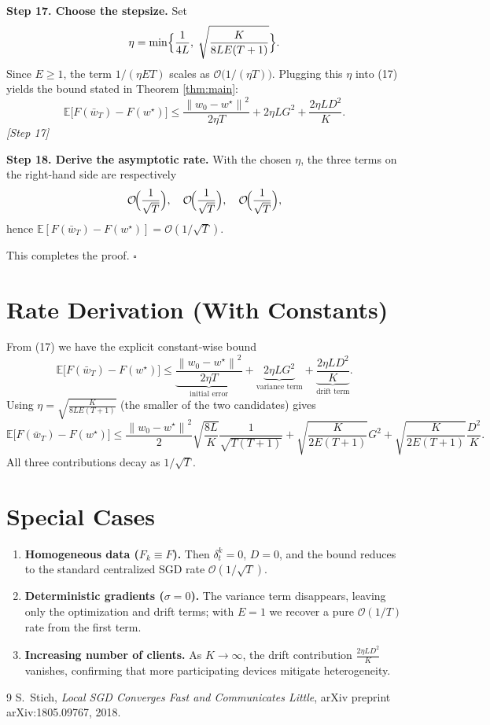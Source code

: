 \documentclass{article}
\newcommand{\EE}{\mathbb{E}}
\newcommand{\norm}[1]{\left\lVert#1\right\rVert}
\begin{document}
\bigskip
\noindent\textbf{Step 17. Choose the stepsize.}  
Set
\[
\eta = \min\Bigl\{\frac{1}{4L},\; \sqrt{\frac{K}{8LE(T+1)}}\Bigr\}.
\]
Since $E\ge1$, the term $1/(\eta E T)$ scales as $\mathcal{O}\bigl(1/(\eta T)\bigr)$. Plugging this $\eta$ into (17) yields the bound stated in Theorem \ref{thm:main}:
\[
\EE\!\bigl[F(\bar w_T)-F(w^\star)\bigr]
\le \frac{\norm{w_0-w^\star}^2}{2\eta T}
   +2\eta L G^2
   +\frac{2\eta L D^2}{K}.
\]
\textit{[Step 17]}

\bigskip
\noindent\textbf{Step 18. Derive the asymptotic rate.}  
With the chosen $\eta$, the three terms on the right‑hand side are respectively
\[
\mathcal{O}\!\Bigl(\frac{1}{\sqrt{T}}\Bigr),\quad
\mathcal{O}\!\Bigl(\frac{1}{\sqrt{T}}\Bigr),\quad
\mathcal{O}\!\Bigl(\frac{1}{\sqrt{T}}\Bigr),
\]
hence $\EE[F(\bar w_T)-F(w^\star)]=\mathcal{O}(1/\sqrt{T})$.

This completes the proof. \hfill $\square$

\section*{Rate Derivation (With Constants)}
From (17) we have the explicit constant‑wise bound
\[
\EE\!\bigl[F(\bar w_T)-F(w^\star)\bigr]
\le
\underbrace{\frac{\norm{w_0-w^\star}^2}{2\eta T}}_{\text{initial error}}
+
\underbrace{2\eta L G^2}_{\text{variance term}}
+
\underbrace{\frac{2\eta L D^2}{K}}_{\text{drift term}} .
\]
Using $\eta = \sqrt{\frac{K}{8LE(T+1)}}$ (the smaller of the two candidates) gives
\[
\EE\!\bigl[F(\bar w_T)-F(w^\star)\bigr]
\le
\frac{\norm{w_0-w^\star}^2}{2}\sqrt{\frac{8L}{K}}\frac{1}{\sqrt{T(T+1)}}
+ \sqrt{\frac{K}{2E(T+1)}} G^2
+ \sqrt{\frac{K}{2E(T+1)}} \frac{D^2}{K} .
\]
All three contributions decay as $1/\sqrt{T}$.

\section*{Special Cases}
\begin{enumerate}
\item \textbf{Homogeneous data ($F_k\equiv F$).}  
Then $\delta_t^k=0$, $D=0$, and the bound reduces to the standard centralized SGD rate $\mathcal{O}(1/\sqrt{T})$.
\item \textbf{Deterministic gradients ($\sigma=0$).}  
The variance term disappears, leaving only the optimization and drift terms; with $E=1$ we recover a pure $\mathcal{O}(1/T)$ rate from the first term.
\item \textbf{Increasing number of clients.}  
As $K\to\infty$, the drift contribution $\frac{2\eta L D^2}{K}$ vanishes, confirming that more participating devices mitigate heterogeneity.
\end{enumerate}

\begin{thebibliography}{9}
S.~Stich, \emph{Local SGD Converges Fast and Communicates Little}, 
arXiv preprint arXiv:1805.09767, 2018.
\end{thebibliography}
\end{document}
